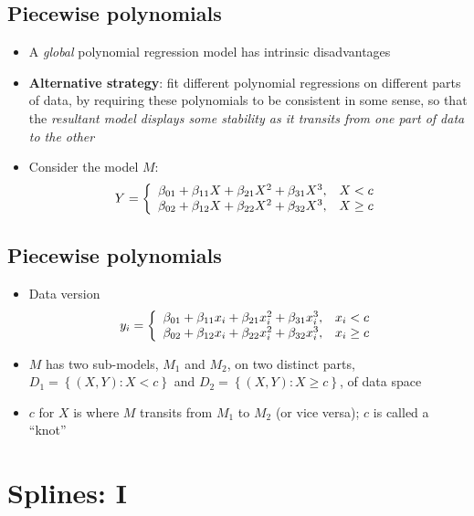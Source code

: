 \documentclass[]{article}
\begin{document}
\subsection{Piecewise polynomials}\label{piecewise-polynomials}

\begin{itemize}
\item
  A \emph{global} polynomial regression model has intrinsic
  disadvantages
\item
  \textbf{Alternative strategy}: fit different polynomial regressions on
  different parts of data, by requiring these polynomials to be
  consistent in some sense, so that the \emph{resultant model displays
  some stability as it transits from one part of data to the other}
\item
  Consider the model \(M\): \[
  Y=\left\{
  \begin{array}
  [c]{cc}%
  \beta_{01}+\beta_{11}X+\beta_{21}X^{2}+\beta_{31}X^{3}, &  X<c\\
  \beta_{02}+\beta_{12}X+\beta_{22}X^{2}+\beta_{32}X^{3}, &  X\geq
  c
  \end{array}
  \right.
  \]
\end{itemize}

\subsection{Piecewise polynomials}\label{piecewise-polynomials-1}

\begin{itemize}
\item
  Data version \[
  y_{i}=\left\{
  \begin{array}
  [c]{cc}%
  \beta_{01}+\beta_{11}x_{i}+\beta_{21}x_{i}^{2}+\beta_{31}x_{i}^{3}, &  x_{i}<c\\
  \beta_{02}+\beta_{12}x_{i}+\beta_{22}x_{i}^{2}+\beta_{32}x_{i}^{3}, &  x_{i}\geq c
  \end{array}
  \right.
  \]
\item
  \(M\) has two sub-models, \(M_{1}\) and \(M_{2}\), on two distinct
  parts, \(D_{1}=\left\{ \left( X,Y\right) :X<c\right\}\) and
  \(D_{2}=\left\{ \left( X,Y\right) :X\geq c\right\}\), of data space
\item
  \(c\) for \(X\) is where \(M\) transits from \(M_{1}\) to \(M_{2}\)
  (or vice versa); \(c\) is called a ``knot''
\end{itemize}

\section{Splines: I}\label{splines-i}
\end{document}
